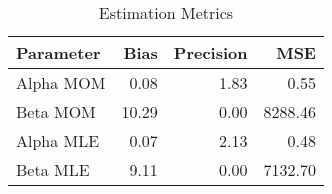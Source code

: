 \begin{table}[ht]
\centering
\caption{Estimation Metrics} 
\label{tab:estimation_metrics}
\begin{tabular}{lrrr}
  \hline
Parameter & Bias & Precision & MSE \\ 
  \hline
Alpha MOM & 0.08 & 1.83 & 0.55 \\ 
  Beta MOM & 10.29 & 0.00 & 8288.46 \\ 
  Alpha MLE & 0.07 & 2.13 & 0.48 \\ 
  Beta MLE & 9.11 & 0.00 & 7132.70 \\ 
   \hline
\end{tabular}
\end{table}

